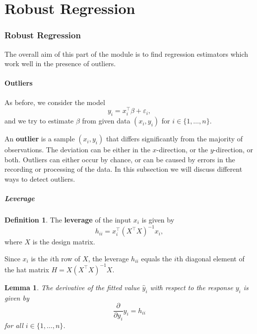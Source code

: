 \documentclass[
  a4paper,
]{article}
\newtheorem{lemma}{Lemma}[section]
\theoremstyle{definition}
\newtheorem{definition}{Definition}[section]
\theoremstyle{definition}
\theoremstyle{definition}
\theoremstyle{definition}
\theoremstyle{remark}
\begin{document}
\clearpage

\part{Robust Regression}\label{part-robust-regression}

\clearpage

\section{Robust Regression}\label{S17-robust}

The overall aim of this part of the module is to find regression
estimators which work well in the presence of outliers.

\subsection{Outliers}\label{outliers}

As before, we consider the model
\begin{equation*}
  y_i
  = x_i^\top \beta + \varepsilon_i,
\end{equation*}
and we try to estimate \(\beta\) from given data \((x_i, y_i)\) for
\(i\in \{1, \ldots, n\}\).

An \textbf{outlier} is a sample \((x_i, y_i)\) that differs significantly
from the majority of observations. The deviation can be either in the
\(x\)-direction, or the \(y\)-direction, or both. Outliers can either
occur by chance, or can be caused by errors in the recording or processing
of the data. In this subsection we will discuss different ways to detect
outliers.

\subsubsection{Leverage}\label{leverage}

\begin{definition}
The \textbf{leverage} of the input \(x_i\) is given by
\begin{equation*}
  h_{ii}
  = x_i^\top (X^\top X)^{-1} x_i,
\end{equation*}
where \(X\) is the design matrix.
\end{definition}

Since \(x_i\) is the \(i\)th row of \(X\), the leverage \(h_{ii}\) equals the \(i\)th
diagonal element of the hat matrix \(H = X (X^\top X)^{-1} X\).

\begin{lemma}
The derivative of the fitted value \(\hat y_i\) with respect to the
response \(y_i\) is given by
\begin{equation*}
  \frac{\partial}{\partial y_i} \hat y_i
  = h_{ii}
\end{equation*}
for all \(i\in \{1, \ldots, n\}\).
\end{lemma}
\end{document}

